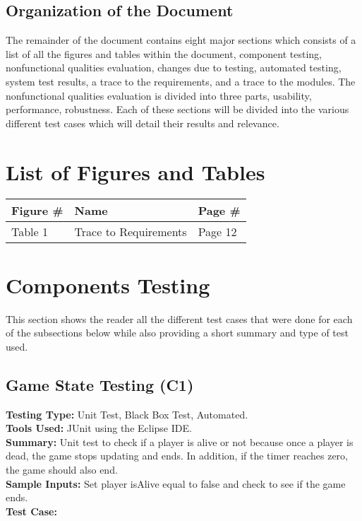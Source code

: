 \documentclass[12pt, letterpaper]{article}
\begin{document}
\subsection{Organization of the Document}
\indent \indent  The remainder of the document contains eight major sections which consists of a list of all the figures and tables within the document, component testing, nonfunctional qualities evaluation, changes due to testing, automated testing, system test results, a trace to the requirements, and a trace to the modules. The nonfunctional qualities evaluation is divided into three parts, usability, performance, robustness. Each of these sections will be divided into the various different test cases which will detail their results and relevance.

\section{List of Figures and Tables}
	\begin{center}
		\begin{tabular}{ p{3cm} p{5cm} p{4cm}  }
			\hline
			\textbf{Figure \#} & \textbf{Name} & \textbf{Page \#} \\ 
			\hline 
			Table 1 & Trace to Requirements & Page 12\\
			\hline
		\end{tabular}				
	\end{center}

\section{Components Testing}
\indent \indent This section shows the reader all the different test cases that were done for each of the subsections below while also providing a short summary and type of test used.
\subsection{Game State Testing (C1)}
\textbf{Testing Type:} Unit Test, Black Box Test, Automated.\\
\noindent \textbf{Tools Used:} JUnit using the Eclipse IDE.\\
\noindent \textbf{Summary:} Unit test to check if a player is alive or not because once a player is dead, the game stops updating and ends. In addition, if the timer reaches zero, the game should also end.\\
\noindent \textbf{Sample Inputs:} Set player isAlive equal to false and check to see if the game ends.\\
\noindent \textbf{Test Case:} \\ 
\end{document}
